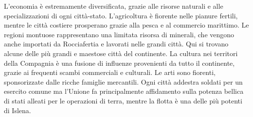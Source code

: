 \documentclass[10pt, a4paper]{report}
\begin{document}
\begin{multicols}{2}
L'economia è estremamente diversificata, grazie alle risorse naturali e alle specializzazioni di ogni città-stato. L'agricoltura è fiorente nelle pianure fertili, mentre le città costiere prosperano grazie alla pesca e al commercio marittimo. Le regioni montuose rappresentano una limitata risorsa di minerali, che vengono anche importati da Rocciafertia e lavorati nelle grandi città. Qui si trovano alcune delle più grandi e maestose città del continente. La cultura nei territori della Compagnia è una fusione di influenze provenienti da tutto il continente, grazie ai frequenti scambi commerciali e culturali. Le arti sono fiorenti, sponsorizzate dalle ricche famiglie mercantili. Ogni città addestra soldati per un esercito comune ma l'Unione fa principalmente affidamento sulla potenza bellica di stati alleati per le operazioni di terra, mentre la flotta è una delle più potenti di Islena.


\end{multicols}
\end{document}
